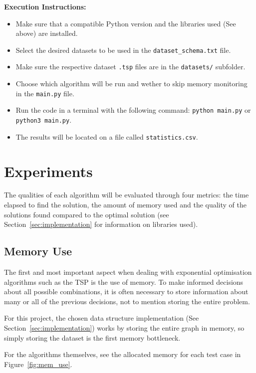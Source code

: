 \documentclass[12pt]{article}
\begin{document}
\textbf{Execution Instructions:}
\begin{itemize}
  \item Make sure that a compatible Python version and the libraries used (See above) are installed.
  \item Select the desired datasets to be used in the \texttt{dataset\_schema.txt} file.
  \item Make sure the respective dataset \texttt{.tsp} files are in the \texttt{datasets/} subfolder.
  \item Choose which algorithm will be run and wether to skip memory monitoring in the \texttt{main.py} file.
  \item Run the code in a terminal with the following command: \texttt{python main.py} or \texttt{python3 main.py}.
  \item The results will be located on a file called \texttt{statistics.csv}.
\end{itemize}

\section{Experiments} \label{sec:experiments}

The qualities of each algorithm will be evaluated through four metrics: the time elapsed 
to find the solution, the amount of memory used and the quality of the solutions found 
compared to the optimal solution (see Section~\ref{sec:implementation} for information 
on libraries used).

\subsection{Memory Use} \label{sec:exp_memory}

The first and most important aspect when dealing with exponential optimisation algorithms such as 
the TSP is the use of memory. To make informed decisions about all possible combinations, 
it is often necessary to store information about many or all of the previous decisions, not to 
mention storing the entire problem.

For this project, the chosen data structure implementation (See Section~\ref{sec:implementation}) works by storing 
the entire graph in memory, so simply storing the dataset is the first memory bottleneck.

For the algorithms themselves, see the allocated memory for each test case in Figure~\ref{fig:mem_use}.
\end{document}
